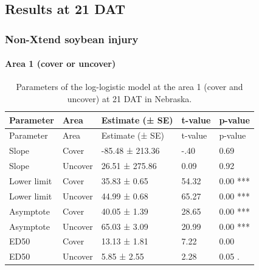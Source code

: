 \documentclass[]{article}
\let\oldparagraph\paragraph
\renewcommand{\paragraph}[1]{\oldparagraph{#1}\mbox{}}
\begin{document}
\pagebreak
\newpage

\subsection{Results at 21 DAT}\label{results-at-21-dat-2}

\subsubsection{Non-Xtend soybean
injury}\label{non-xtend-soybean-injury-4}

\paragraph{Area 1 (cover or uncover)}\label{area-1-cover-or-uncover}

\begin{longtable}[]{@{}lllll@{}}
\caption{Parameters of the log-logistic model at the area 1 (cover and
uncover) at 21 DAT in Nebraska.}\tabularnewline
\toprule
Parameter & Area & Estimate (± SE) & t-value & p-value\tabularnewline
\midrule
\endfirsthead
\toprule
Parameter & Area & Estimate (± SE) & t-value & p-value\tabularnewline
\midrule
\endhead
Slope & Cover & -85.48 ± 213.36 & -.40 & 0.69\tabularnewline
Slope & Uncover & 26.51 ± 275.86 & 0.09 & 0.92\tabularnewline
Lower limit & Cover & 35.83 ± 0.65 & 54.32 & 0.00 ***\tabularnewline
Lower limit & Uncover & 44.99 ± 0.68 & 65.27 & 0.00 ***\tabularnewline
Asymptote & Cover & 40.05 ± 1.39 & 28.65 & 0.00 ***\tabularnewline
Asymptote & Uncover & 65.03 ± 3.09 & 20.99 & 0.00 ***\tabularnewline
ED50 & Cover & 13.13 ± 1.81 & 7.22 & 0.00\tabularnewline
ED50 & Uncover & 5.85 ± 2.55 & 2.28 & 0.05 .\tabularnewline
\bottomrule
\end{longtable}
\end{document}
